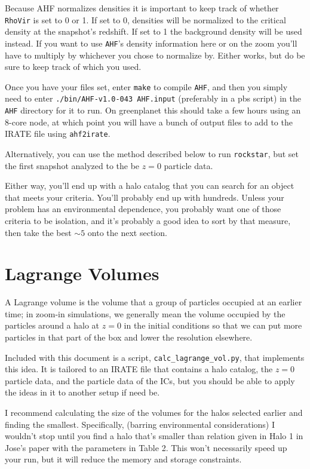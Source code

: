 \documentclass[10pt,a4paper,onecolumn]{article}
\begin{document}
Because AHF normalizes densities it is important to keep track of whether \texttt{RhoVir} is set to 0 or 1.  If set to 0, densities will be normalized to the critical density at the snapshot's redshift.  If set to 1 the background density will be used instead.  If you want to use \texttt{AHF}'s density information here or on the zoom you'll have to multiply by whichever you chose to normalize by.  Either works, but do be sure to keep track of which you used.

Once you have your files set, enter \texttt{make} to compile \texttt{AHF}, and then you simply need to enter \texttt{./bin/AHF-v1.0-043 AHF.input} (preferably in a pbs script) in the \texttt{AHF} directory for it to run.  On greenplanet this should take a few hours using an 8-core node, at which point you will have a bunch of output files to add to the IRATE file using \texttt{ahf2irate}.

Alternatively, you can use the method described below to run  \texttt{rockstar}, 
but set the first snapshot analyzed to the be $z = 0$ particle data.

Either way, you'll end up with a halo catalog that you can search for an
object that meets your criteria.  You'll probably end up with hundreds.  Unless
your problem has an environmental dependence, you probably want one of
those criteria to be isolation, and it's probably a good idea to sort by that
measure, then take the best $\sim5$ onto the next section.

\section{Lagrange Volumes}
A Lagrange volume is the volume that a group of particles occupied at an
earlier time; in zoom-in simulations, we generally mean the volume occupied
by the particles around a halo at $z = 0$ in the initial conditions so that we
can put more particles in that part of the box and lower the resolution elsewhere.

Included with this document is a script, \texttt{calc\_lagrange\_vol.py}, that 
implements this idea.  It is tailored to an IRATE file that contains a halo 
catalog, the $z=0$ particle data, and the particle data of the ICs, but you
should be able to apply the ideas in it to another setup if need be.  

I recommend calculating the size of the volumes for the halos selected earlier and 
finding the smallest.  Specifically,  (barring environmental considerations) I wouldn't 
stop until you find a halo that's smaller than relation given in Halo 1 in Jose's paper 
with the parameters in Table 2.  This won't necessarily speed up your run, but it will
reduce the memory and storage constraints.
\end{document}
